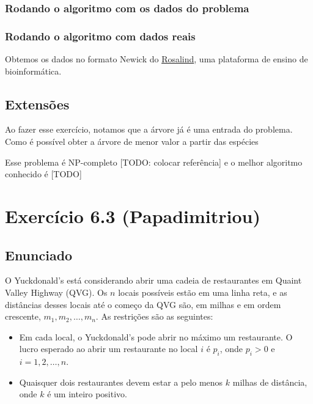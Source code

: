 \documentclass[11pt]{article}
\begin{document}
\subsubsection{Rodando o algoritmo com os dados do problema}
\label{sec-2-3-2}

\subsubsection{Rodando o algoritmo com dados reais}
\label{sec-2-3-3}

Obtemos os dados no formato Newick do \href{http://rosalind.info}{Rosalind}, uma plataforma de
ensino de bioinformática.

\subsection{Extensões}
\label{sec-2-4}

Ao fazer esse exercício, notamos que a árvore já é uma entrada do problema.
Como é possível obter a árvore de menor valor a partir das espécies

Esse problema é NP-completo [TODO: colocar referência] e o melhor
algoritmo conhecido é [TODO]

\section{Exercício 6.3 (Papadimitriou)}
\label{sec-3}

\subsection{Enunciado}
\label{sec-3-1}

O Yuckdonald's está considerando abrir uma cadeia de restaurantes em
Quaint Valley Highway (QVG). Os $n$ locais possíveis estão em uma
linha reta, e as distâncias desses locais até o começo da QVG são, em
milhas e em ordem crescente, $m_1, m_2, \ldots, m_n$. As restrições
são as seguintes:

\begin{itemize}
\item Em cada local, o Yuckdonald's pode abrir no máximo um
restaurante. O lucro esperado ao abrir um restaurante no local
$i$ é $p_i$, onde $p_i > 0$ e $i = 1, 2, \ldots, n$.
\item Quaisquer dois restaurantes devem estar a pelo menos $k$
  milhas de distância, onde $k$ é um inteiro positivo.
\end{itemize}
\end{document}
